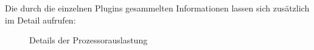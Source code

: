 Die durch die einzelnen Plugins gesammelten Informationen lassen sich zusätzlich im Detail aufrufen:

\begin{figure}[ht]
	\centering
		\caption{Details der Prozessorauslastung}
		\label{cpuload}
\end{figure}
